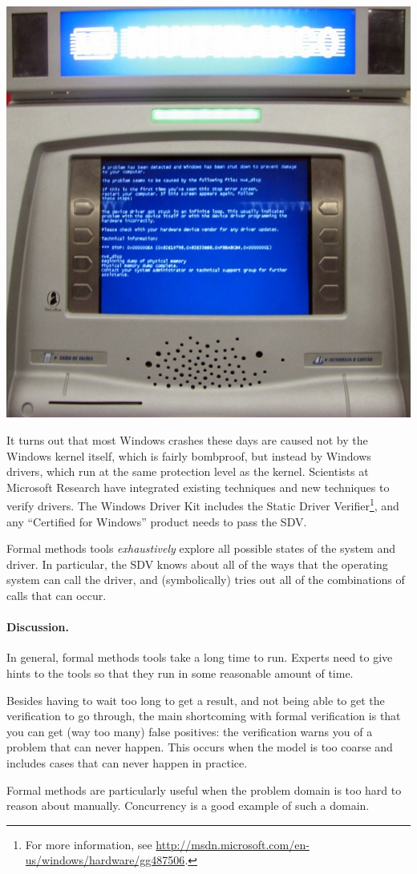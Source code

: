 \begin{center}
\includegraphics[width=.35\textwidth]{images/DeLaRue_ATM_Crash.jpg}
\end{center}

It turns out that most Windows crashes these days are caused not by
the Windows kernel itself, which is fairly bombproof, but instead by
Windows drivers, which run at the same protection level as the kernel. Scientists at Microsoft Research have integrated existing techniques
and new techniques to verify drivers. The Windows Driver Kit includes
the Static Driver Verifier\footnote{For more information, see
  \url{http://msdn.microsoft.com/en-us/windows/hardware/gg487506}.},
and any ``Certified for Windows'' product needs to pass the SDV.

Formal methods tools \emph{exhaustively} explore all possible states
of the system and driver. In particular, the SDV knows about all of the 
ways that the operating system can call the driver, and (symbolically) tries out
all of the combinations of calls that can occur.


\paragraph{Discussion.} In general, formal methods tools take a long time to run. Experts need to give hints to the tools so that they run in some reasonable amount of time.

Besides having to wait too long to get a result, and not being able to
get the verification to go through, the main shortcoming with formal
verification is that you can get (way too many) false positives: the
verification warns you of a problem that can never happen. This occurs
when the model is too coarse and includes cases that can never happen
in practice.

Formal methods are particularly useful when the problem domain is too
hard to reason about manually. Concurrency is a good example of such a 
domain.


